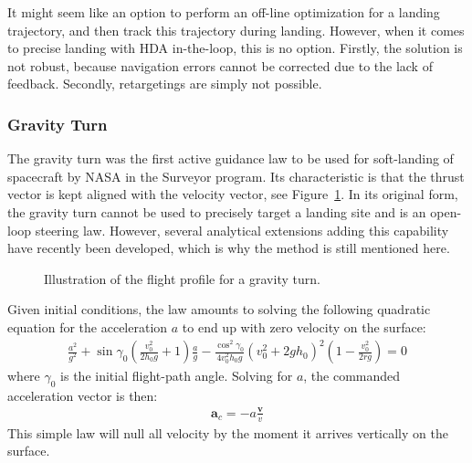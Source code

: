 \documentclass[%
]{aiaa-tc}
\begin{document}
It might seem like an option to perform an off-line optimization for a
landing trajectory, and then track this trajectory during landing. However, when
it comes to precise landing with HDA in-the-loop, this is no option. Firstly,
the solution is not robust, because navigation errors cannot be corrected due to
the lack of feedback. Secondly, retargetings are simply not possible. 

\subsubsection{Gravity Turn}

The gravity turn was the first active guidance law to be used for soft-landing
of spacecraft by NASA in the Surveyor program.\cite{Cheng1964} Its characteristic is
that the thrust vector is kept aligned with the velocity vector, see
Figure~\ref{fig:gravityturn}. In its original form, the gravity turn cannot be
used to precisely target a landing site and is an open-loop steering law.
However, several analytical extensions adding this capability have recently been
developed, which is why the method is still mentioned here.

\begin{figure}
    \centering \small
    \caption{Illustration of the flight profile for a gravity turn.}
    \label{fig:gravityturn}
\end{figure}

Given initial conditions, the law amounts to solving the following quadratic
equation for the acceleration $a$ to end up with zero velocity on the
surface:\cite{Citron1964}
\begin{align}
	\frac{a^2}{g^2}+ \sin\gamma_0 \left(\frac{v_0^2}{2h_0g}+1\right)
	\frac{a}{g} - \frac{\cos^2\gamma_0}{4v_0^2h_0g}
	\left(v_0^2+2gh_0\right)^2 \left(1 - \frac{v_0^2}{2rg}\right)=0
    \label{eq:gravt}
\end{align}
where $\gamma_0$ is the initial flight-path angle. Solving for $a$, the
commanded acceleration vector is then:
\begin{align}
    \mathbf{a}_c = -a \frac{\mathbf{v}}{v}
\end{align}
This simple law will null all velocity by the moment it arrives vertically on
the surface.
\end{document}
